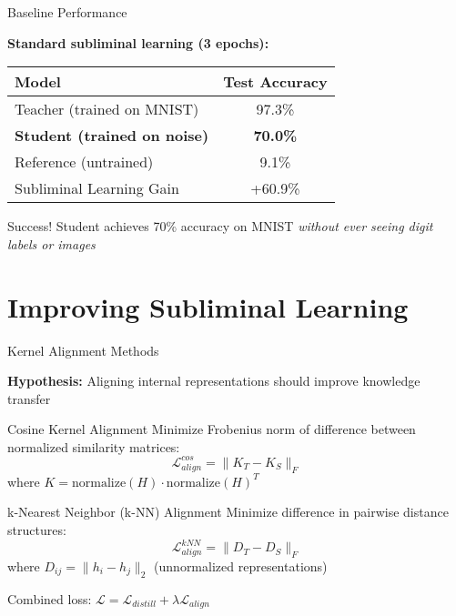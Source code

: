 \documentclass{beamer}
\begin{document}
\begin{frame}{Baseline Performance}

\textbf{Standard subliminal learning (3 epochs):}

\vspace{1em}

\begin{table}
\centering
\begin{tabular}{lc}
\toprule
Model & Test Accuracy \\
\midrule
Teacher (trained on MNIST) & 97.3\% \\
\textbf{Student (trained on noise)} & \textbf{70.0\%} \\
Reference (untrained) & 9.1\% \\
\midrule
Subliminal Learning Gain & +60.9\% \\
\bottomrule
\end{tabular}
\end{table}

\vspace{1em}

\begin{alertblock}{Success!}
Student achieves 70\% accuracy on MNIST \emph{without ever seeing digit labels or images}
\end{alertblock}

\end{frame}

\section{Improving Subliminal Learning}

\begin{frame}{Kernel Alignment Methods}

\textbf{Hypothesis:} Aligning internal representations should improve knowledge transfer

\vspace{1em}

\begin{block}{Cosine Kernel Alignment}
Minimize Frobenius norm of difference between normalized similarity matrices:
$$\mathcal{L}_{align}^{cos} = \|K_T - K_S\|_F$$
where $K = \text{normalize}(H) \cdot \text{normalize}(H)^T$
\end{block}

\vspace{0.5em}

\begin{block}{k-Nearest Neighbor (k-NN) Alignment}
Minimize difference in pairwise distance structures:
$$\mathcal{L}_{align}^{kNN} = \|D_T - D_S\|_F$$
where $D_{ij} = \|h_i - h_j\|_2$ (unnormalized representations)
\end{block}

\vspace{0.5em}

Combined loss: $\mathcal{L} = \mathcal{L}_{distill} + \lambda \mathcal{L}_{align}$

\end{frame}
\end{document}
